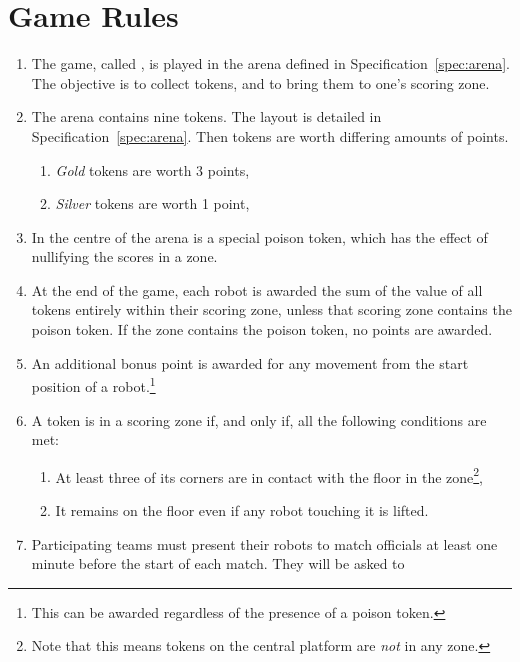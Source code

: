 \section{Game Rules}
\label{sec:rules}

\begin{enumerate}
  \item The game, called \emph{\gamename}, is played in the arena defined in
        Specification~\ref{spec:arena}. The objective is to collect tokens, and
        to bring them to one's scoring zone.
  \item The arena contains nine tokens. The layout is detailed in
        Specification~\ref{spec:arena}. Then tokens are worth differing amounts
        of points.
        \begin{enumerate}
          \item \emph{Gold} tokens are worth 3 points,
          \item \emph{Silver} tokens are worth 1 point,
        \end{enumerate}
  \item In the centre of the arena is a special poison token, which has the
        effect of nullifying the scores in a zone.
  \item At the end of the game, each robot is awarded the sum of the value of
        all tokens entirely within their scoring zone, unless that scoring zone
        contains the poison token. If the zone contains the poison token, no
        points are awarded.
  \item An additional bonus point is awarded for any movement from the
        start position of a robot.\footnote{This can be awarded regardless of
        the presence of a poison token.}
  \item A token is in a scoring zone if, and only if, all the following
        conditions are met:
        \begin{enumerate}
          \item At least three of its corners are in contact with the floor in
                the zone\footnote{Note that this means tokens on the central
                platform are \emph{not} in any zone.},
          \item It remains on the floor even if any robot touching it is lifted.
        \end{enumerate}
  \item Participating teams must present their robots to match officials at
        least one minute before the start of each match. They will be asked to

\end{enumerate}
